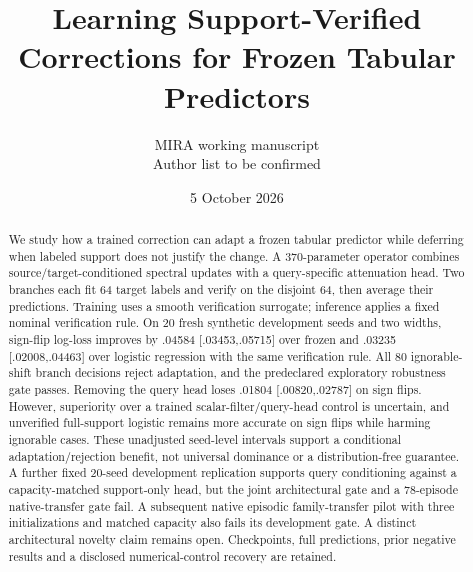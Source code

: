 \documentclass[10pt]{article}
\title{Learning Support-Verified Corrections for Frozen Tabular Predictors}
\author{MIRA working manuscript\\Author list to be confirmed}
\date{5 October 2026}
\begin{document}
\maketitle
\begin{center}
\end{center}

\begin{abstract}
We study how a trained correction can adapt a frozen tabular predictor while deferring when labeled support does not justify the change. A 370-parameter operator combines source/target-conditioned spectral updates with a query-specific attenuation head. Two branches each fit 64 target labels and verify on the disjoint 64, then average their predictions. Training uses a smooth verification surrogate; inference applies a fixed nominal verification rule. On 20 fresh synthetic development seeds and two widths, sign-flip log-loss improves by .04584 [.03453,.05715] over frozen and .03235 [.02008,.04463] over logistic regression with the same verification rule. All 80 ignorable-shift branch decisions reject adaptation, and the predeclared exploratory robustness gate passes. Removing the query head loses .01804 [.00820,.02787] on sign flips. However, superiority over a trained scalar-filter/query-head control is uncertain, and unverified full-support logistic remains more accurate on sign flips while harming ignorable cases. These unadjusted seed-level intervals support a conditional adaptation/rejection benefit, not universal dominance or a distribution-free guarantee. A further fixed 20-seed development replication supports query conditioning against a capacity-matched support-only head, but the joint architectural gate and a 78-episode native-transfer gate fail. A subsequent native episodic family-transfer pilot with three initializations and matched capacity also fails its development gate. A distinct architectural novelty claim remains open. Checkpoints, full predictions, prior negative results and a disclosed numerical-control recovery are retained.
\end{abstract}
\end{document}
